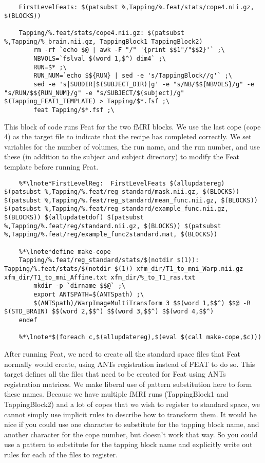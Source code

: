 \begin{lstlisting}
	FirstLevelFeats: $(patsubst %,Tapping/%.feat/stats/cope4.nii.gz, $(BLOCKS))

	Tapping/%.feat/stats/cope4.nii.gz: $(patsubst %,Tapping/%_brain.nii.gz, TappingBlock1 TappingBlock2)
		rm -rf `echo $@ | awk -F "/" '{print $$1"/"$$2}'` ;\
		NBVOLS=`fslval $(word 1,$^) dim4` ;\
		RUN=$* ;\
		RUN_NUM=`echo $${RUN} | sed -e 's/TappingBlock//g'` ;\
		sed -e 's|SUBDIR|$(SUBJECT_DIR)|g' -e "s/NB/$${NBVOLS}/g" -e "s/RUN/$${RUN_NUM}/g" -e "s/SUBJECT/$(subject)/g" $(Tapping_FEAT1_TEMPLATE) > Tapping/$*.fsf ;\
		feat Tapping/$*.fsf ;\

\end{lstlisting}
This block of code runs Feat for the two fMRI blocks. We use the last
cope (cope 4) as the target file to indicate that the recipe has
completed correctly. We set variables for the number of volumes, the
run name, and the run number, and use these (in addition to the
subject and subject directory) to modify the Feat template before
running Feat.



\begin{lstlisting}
	%*\lnote*FirstLevelReg:  FirstLevelFeats $(allupdatereg) $(patsubst %,Tapping/%.feat/reg_standard/mask.nii.gz, $(BLOCKS))  $(patsubst %,Tapping/%.feat/reg_standard/mean_func.nii.gz, $(BLOCKS)) $(patsubst %,Tapping/%.feat/reg_standard/example_func.nii.gz, $(BLOCKS)) $(allupdatetdof) $(patsubst %,Tapping/%.feat/reg/standard.nii.gz, $(BLOCKS)) $(patsubst %,Tapping/%.feat/reg/example_func2standard.mat, $(BLOCKS)) 

	%*\lnote*define make-cope
	Tapping/%.feat/reg_standard/stats/$(notdir $(1)): Tapping/%.feat/stats/$(notdir $(1)) xfm_dir/T1_to_mni_Warp.nii.gz xfm_dir/T1_to_mni_Affine.txt xfm_dir/%_to_T1_ras.txt
		mkdir -p `dirname $$@` ;\
		export ANTSPATH=$(ANTSpath) ;\
		$(ANTSpath)/WarpImageMultiTransform 3 $$(word 1,$$^) $$@ -R $(STD_BRAIN) $$(word 2,$$^) $$(word 3,$$^) $$(word 4,$$^)
	endef

	%*\lnote*$(foreach c,$(allupdatereg),$(eval $(call make-cope,$c)))
\end{lstlisting}
After running Feat, we need to create all the standard space files
that Feat normally would create, using ANTs registration instead of
FEAT to do so. \lnum{14} This target defines all the files that need to be created for Feat using
ANTs registration matrices. We make liberal use of pattern
substitution here to form these names.  Because we have
multiple fMRI runs (TappingBlock1 and TappingBlock2) and a lot of
copes that we wish to register to standard space, we cannot simply use
implicit rules to describe how to transform them. It would be nice if
you could use one character to substitute for the tapping block name,
and another character for the cope number, but \maken{} doesn't work
that way. So you could use a pattern to substitute for the tapping
block name and explicitly write out rules for each of the files to
register. 

